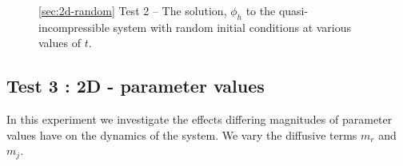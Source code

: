 \documentclass[final]{amsart}
\numberwithin{equation}{section}
\begin{document}
\begin{figure}[h!]
  \caption[]
          {
            \label{fig:2d-random-solution-plot} 
            \ref{sec:2d-random} Test 2 -- The solution, $\phi_h$ to
            the quasi-incompressible system with random initial conditions
             at various values of $t$. }
          \begin{center}
            \hfill
            \hfill
             \hfill
             \hfill
             \hfill
              \hfill
          \end{center}
\end{figure}

\subsection{Test 3 : 2D - parameter values}
\label{sec:2d-sims}

In this experiment we investigate the effects differing magnitudes of
parameter values have on the dynamics of the system. We vary the
diffusive terms $m_r$ and $m_j$. 
\end{document}
